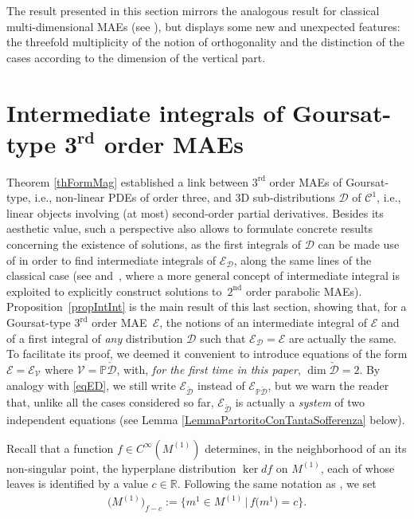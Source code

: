 \documentclass[pdftex]{sigma}
\newcommand{\R}{\mathbb{R}}
\newcommand{\C}{\mathcal{C}}
\newcommand{\D}{\mathcal{D}}
\newcommand{\M}{\mathcal{V}}
\newcommand{\E}{\mathcal{E}}
\renewcommand{\P}{\mathbb{P}}
\newcommand{\Rd}{^\textrm{rd}}
\newcommand{\Nd}{^\textrm{nd}}
\newcommand{\Ddue}{{\check{\mathcal{D}}}}
\numberwithin{equation}{section}
\begin{document}
The result presented in this section mirrors the analogous result for classical multi-dimensional MAEs (see \cite[Theorem~1]{MR2985508}), but displays some new and unexpected features: the threefold multiplicity of the notion of orthogonality and the distinction of the cases according to the dimension of the vertical part.

\section[Intermediate integrals of Goursat-type $3\Rd$ order MAEs]{Intermediate integrals of Goursat-type $\boldsymbol{3\Rd}$ order MAEs}\label{secIntInt}

Theorem \ref{thFormMag} established a link between $3\Rd$ order MAEs of Goursat-type, i.e., non-linear PDEs of order three, and 3D sub-distributions $\D$ of $\C^1$, i.e., linear objects involving (at most) second-order partial derivatives. Besides its aesthetic value, such a perspective also allows to formulate concrete results concerning the existence of solutions, as the f\/irst integrals of $\D$ can be made use of in order to f\/ind intermediate integrals of $\E_\D$, along the same lines of the classical case (see \cite[Section~6.3]{MR2985508} and~\cite{Alekseevsky2014144}, where a more general concept of intermediate integral is exploited to explicitly construct solutions to~$2\Nd$ order parabolic MAEs). Proposition~\ref{propIntInt} is the main result of this last section, showing that, for a Goursat-type $3\Rd$ order MAE~$\E$, the notions of an intermediate integral of $\E$ and of a f\/irst integral of \emph{any} distribution $\D$ such that $\E_\D=\E$ are actually the same. To facilitate its proof, we deemed it convenient to introduce equations of the form $\E=\E_\M$ where $\M=\P\Ddue$, with, \emph{for the first time in this paper}, $\dim\Ddue=2$. By analogy with \eqref{eqED}, we still write $\E_\Ddue$ instead of $\E_{\P\Ddue}$, but we warn the reader that, unlike all the cases considered so far, $\E_\Ddue$ is actually a \emph{system} of two independent equations (see Lemma \ref{LemmaPartoritoConTantaSofferenza} below).

Recall that a function $f\in C^\infty(M^{(1)})$ determines, in the neighborhood of an its non-singular point, the hyperplane distribution $\ker d f$ on $M^{(1)}$, each of whose leaves is identif\/ied by a value $c\in\R$. Following the same notation as \cite{MR2985508}, we set
\begin{gather*}
 \big(M^{(1)}\big)_{f-c}:=\big\{m^1\in M^{(1)}\,|\, f\big(m^1\big)=c\big\} .
\end{gather*}
\end{document}
